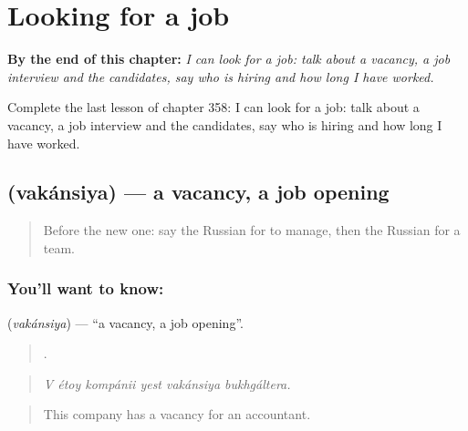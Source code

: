 
\chapter{Looking for a job}
\label{ch:ru-looking-for-a-job}

\begin{chapteropening}
\textbf{By the end of this chapter:} \emph{I can look for a job: talk about a vacancy, a job interview and the candidates, say who is hiring and how long I have worked.}

Complete the last lesson of chapter 358: I can look for a job: talk about a vacancy, a job interview and the candidates, say who is hiring and how long I have worked.
\end{chapteropening}

\section[\texorpdfstring{\ru{вакансия} (vakánsiya)}{вакансия (vakánsiya)}]{ (vakánsiya) — a vacancy, a job opening}

\label{lesson:RU-C358-vakansiya}



\begin{quote}
Before the new one: say the Russian for to manage, then the Russian for a team.
\end{quote}

\subsection*{You'll want to know: }
\textbf{} (\emph{vakánsiya}) — \textquotedblleft{}a vacancy, a job opening\textquotedblright{}.

\begin{quote}
     .
\end{quote}

\begin{quote}
\emph{V étoy kompánii yest vakánsiya bukhgáltera.}
\end{quote}

\begin{quote}
This company has a vacancy for an accountant.
\end{quote}

